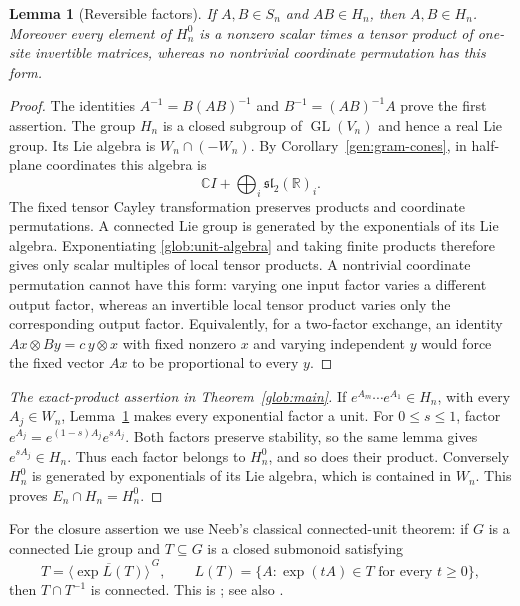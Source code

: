 \documentclass[reqno]{amsart}
\newtheorem{lemma}[theorem]{Lemma}
\theoremstyle{definition}
\theoremstyle{remark}
\newcommand{\C}{\mathbb C}
\newcommand{\R}{\mathbb R}
\begin{document}
\begin{lemma}[Reversible factors]\label{glob:unit-factors}
If $A,B\in S_n$ and $AB\in H_n$, then $A,B\in H_n$.
Moreover every element of $H_n^0$ is a nonzero scalar times a tensor
product of one-site invertible matrices, whereas no nontrivial coordinate
permutation has this form.
\end{lemma}

\begin{proof}
The identities $A^{-1}=B(AB)^{-1}$ and $B^{-1}=(AB)^{-1}A$ prove
the first assertion.  The group $H_n$ is a closed subgroup of
$\operatorname{GL}(V_n)$ and hence a real Lie group.  Its Lie algebra
is $W_n\cap(-W_n)$.  By Corollary~\ref{gen:gram-cones}, in
half-plane coordinates this algebra is
\begin{equation}\label{glob:unit-algebra}
 \C I+\bigoplus_i\mathfrak{sl}_2(\R)_i.
\end{equation}
The fixed tensor Cayley transformation preserves products and
coordinate permutations.  A connected Lie group is generated by the
exponentials of its Lie algebra.  Exponentiating
\eqref{glob:unit-algebra} and taking finite products therefore gives
only scalar multiples of local tensor products.
A nontrivial coordinate permutation cannot have this form: varying one
input factor varies a different output factor, whereas an invertible
local tensor product varies only the corresponding output factor.
Equivalently, for a two-factor exchange, an identity
$Ax\otimes By=c\,y\otimes x$ with fixed nonzero $x$ and varying
independent $y$ would force the fixed vector $Ax$ to be proportional
to every $y$.
\end{proof}

\begin{proof}[The exact-product assertion in Theorem~\ref{glob:main}]
If $e^{A_m}\cdots e^{A_1}\in H_n$, with every $A_j\in W_n$,
Lemma~\ref{glob:unit-factors} makes every exponential factor a unit.
For $0\leq s\leq1$, factor
$e^{A_j}=e^{(1-s)A_j}e^{sA_j}$.  Both factors preserve stability,
so the same lemma gives $e^{sA_j}\in H_n$.  Thus each factor belongs
to $H_n^0$, and so does their product.  Conversely $H_n^0$ is
generated by exponentials of its Lie algebra, which is contained in
$W_n$.  This proves $E_n\cap H_n=H_n^0$.
\end{proof}

For the closure assertion we use Neeb's classical connected-unit theorem:
if $G$ is a connected Lie group and $T\subseteq G$ is a closed
submonoid satisfying
\[
 T=\overline{\langle\exp L(T)\rangle}^{\,G},\qquad
 L(T)=\{A:\exp(tA)\in T\text{ for every }t\geq0\},
\]
then $T\cap T^{-1}$ is connected. This is
\cite[Definition~II.1(3) and Proposition~III.2, pp.~171, 178]{Neeb92};
see also \cite[Section~6.1]{SanMartinSantana02}.
\end{document}
